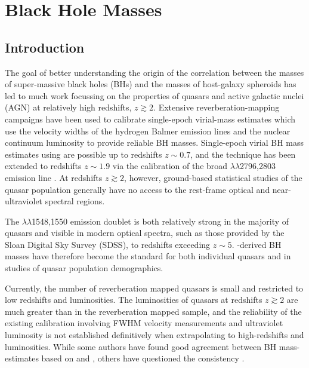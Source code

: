 
\chapter{Black Hole Masses}
\label{ch:bhmass}

\section{Introduction}

The goal of better understanding the origin of the correlation between the masses of super-massive black holes (BHs) and the masses of host-galaxy spheroids has led to much work focussing on the properties of quasars and active galactic nuclei (AGN) at relatively high redshifts, $z\gtrsim 2$. 
Extensive reverberation-mapping campaigns have been used to calibrate single-epoch virial-mass estimates which use the velocity widths of the hydrogen Balmer emission lines and the nuclear continuum luminosity to provide reliable BH masses.  
Single-epoch virial BH mass estimates using \hb are possible up to redshifts $z\sim0.7$, and the technique has been extended to redshifts $z\sim1.9$ via the calibration of the broad $\lambda\lambda$2796,2803 emission line \citep{mclure02,onken08,wang09,rafiee11}. 
At redshifts $z\gtrsim2$, however, ground-based statistical studies of the quasar population generally have no access to the rest-frame optical and near-ultraviolet spectral regions.

The $\lambda\lambda$1548,1550 emission doublet is both relatively strong in the majority of quasars and visible in modern optical spectra, such as those provided by the Sloan Digital Sky Survey (SDSS), to redshifts exceeding $z\sim5$. 
-derived BH masses have therefore become the standard \citep[e.g.][]{vestergaard06,park13} for both individual quasars and in studies of quasar population demographics.

Currently, the number of reverberation mapped quasars is small \citep[$\sim$50 quasars;][]{park13} and restricted to low redshifts and luminosities. 
The luminosities of quasars at redshifts $z\gtrsim 2$ are much greater than in the reverberation mapped sample, and the reliability of the existing calibration involving  FWHM velocity measurements and ultraviolet luminosity is not established definitively when extrapolating to high-redshifts and luminosities. 
While some authors have found good agreement between BH mass-estimates based on  and \hb \citep[e.g.][]{vestergaard06, assef11, tilton13}, others have questioned the consistency \citep[e.g.][]{baskin05,trakhtenbrot12,shen12}.

